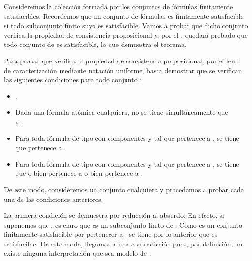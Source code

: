 \begin{isabellebody}
\begin{isamarkuptext}
  \begin{demostracion}
    Consideremos la colección  formada por los conjuntos de fórmulas finitamente satisfacibles.
    Recordemos que un conjunto de fórmulas es finitamente satisfacible si todo subconjunto finito 
    suyo es satisfacible. Vamos a probar que dicho conjunto verifica la propiedad de consistencia 
    proposicional y, por el , quedará probado que todo conjunto de 
     es satisfacible, lo que demuestra el teorema.

    Para probar que  verifica la propiedad de consistencia proposicional, por el lema  de 
    caracterización mediante notación uniforme, basta demostrar que se verifican las siguientes 
    condiciones para todo conjunto :
    \begin{itemize}
     \item {}.
     \item Dada  una fórmula atómica cualquiera, no se tiene 
      simultáneamente que\\  y .
     \item Para toda fórmula de tipo \isa{{\isasymalpha}} con componentes  y  tal que \isa{{\isasymalpha}}
      pertenece a , se tiene que  pertenece a .
     \item Para toda fórmula de tipo \isa{{\isasymbeta}} con componentes  y  tal que \isa{{\isasymbeta}}
      pertenece a , se tiene que o bien  pertenece a  o 
      bien  pertenece a .
    \end{itemize}

    De este modo, consideremos un conjunto cualquiera  y procedamos a probar cada una de las
    condiciones anteriores.

    La primera condición se demuestra por reducción al absurdo. En efecto, si suponemos que 
    , es claro que \isa{{\isacharbraceleft}{\isasymbottom}{\isacharbraceright}} es un subconjunto finito de . Como  es un conjunto
    finitamente satisfacible por pertenecer a , se tiene por lo anterior que \isa{{\isacharbraceleft}{\isasymbottom}{\isacharbraceright}} es 
    satisfacible. De este modo, llegamos a una contradicción pues, por definición, no existe ninguna 
    interpretación que sea modelo de \isa{{\isasymbottom}}.


\end{demostracion}
\end{isamarkuptext}
\end{isabellebody}
